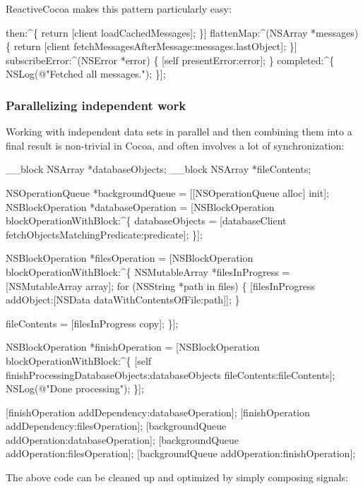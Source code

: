 Reactive\+Cocoa makes this pattern particularly easy\+:


\begin{DoxyCode}
[[[[client logIn]
    then:^\{
        return [client loadCachedMessages];
    \}]
    flattenMap:^(NSArray *messages) \{
        return [client fetchMessagesAfterMessage:messages.lastObject];
    \}]
    subscribeError:^(NSError *error) \{
        [self presentError:error];
    \} completed:^\{
        NSLog(@"Fetched all messages.");
    \}];
\end{DoxyCode}


\subsubsection*{Parallelizing independent work}

Working with independent data sets in parallel and then combining them into a final result is non-\/trivial in Cocoa, and often involves a lot of synchronization\+:


\begin{DoxyCode}
\_\_block NSArray *databaseObjects;
\_\_block NSArray *fileContents;

NSOperationQueue *backgroundQueue = [[NSOperationQueue alloc] init];
NSBlockOperation *databaseOperation = [NSBlockOperation blockOperationWithBlock:^\{
    databaseObjects = [databaseClient fetchObjectsMatchingPredicate:predicate];
\}];

NSBlockOperation *filesOperation = [NSBlockOperation blockOperationWithBlock:^\{
    NSMutableArray *filesInProgress = [NSMutableArray array];
    for (NSString *path in files) \{
        [filesInProgress addObject:[NSData dataWithContentsOfFile:path]];
    \}

    fileContents = [filesInProgress copy];
\}];

NSBlockOperation *finishOperation = [NSBlockOperation blockOperationWithBlock:^\{
    [self finishProcessingDatabaseObjects:databaseObjects fileContents:fileContents];
    NSLog(@"Done processing");
\}];

[finishOperation addDependency:databaseOperation];
[finishOperation addDependency:filesOperation];
[backgroundQueue addOperation:databaseOperation];
[backgroundQueue addOperation:filesOperation];
[backgroundQueue addOperation:finishOperation];
\end{DoxyCode}


The above code can be cleaned up and optimized by simply composing signals\+:


